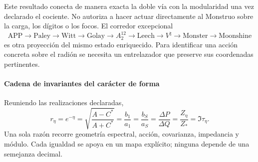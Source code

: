 Este resultado conecta de manera exacta la doble vía con la modularidad una
vez declarado el cociente. No autoriza a hacer actuar directamente al
Monstruo sobre la carga, los dígitos o los focos. El corredor excepcional
\[
\mathrm{APP}\to\mathrm{Paley}\to\mathrm{Witt}\to\mathrm{Golay}
\to A_2^{12}\to\mathrm{Leech}\to V^\natural
\to\mathrm{Monster}\to\mathrm{Moonshine}
\]
es otra proyección del mismo estado enriquecido. Para identificar una acción
concreta sobre el radión se necesita un entrelazador que preserve sus
coordenadas pertinentes.

\paragraph{Cadena de invariantes del carácter de forma}

Reuniendo las realizaciones declaradas,
\begin{equation}
\boxed{
r_\eta=e^{-\eta}
=\sqrt{\frac{A-C^*}{A+C^*}}
=\frac{b_1}{a_1}
=\frac{b_S}{a_S}
=\frac{\Delta P}{\Delta Q}
=\frac{Z_\eta}{Z_*}
=\Im\tau_\eta.}
\label{eq:shape-master}
\end{equation}
Una sola razón recorre geometría espectral, acción, covarianza, impedancia y
módulo. Cada igualdad se apoya en un mapa explícito; ninguna depende de una
semejanza decimal.

